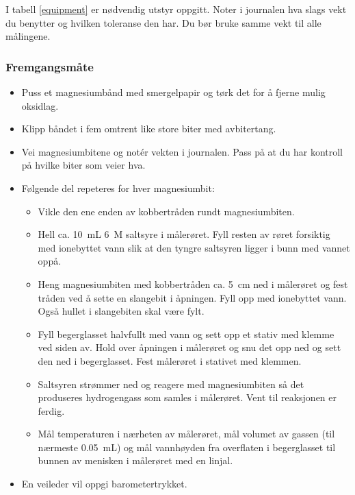 	I tabell \ref{equipment} er nødvendig utstyr oppgitt.	Noter i journalen hva slags vekt du benytter og hvilken toleranse den har. Du bør bruke samme vekt til alle målingene.
	
	\subsubsection{Fremgangsmåte}
	\begin{itemize}
		\item Puss et magnesiumbånd med smergelpapir og tørk det for å fjerne mulig oksidlag.
		
		\item Klipp båndet i fem omtrent like store biter med avbitertang.
		
		\item Vei magnesiumbitene og notér vekten i journalen. Pass på at du har kontroll på hvilke biter som veier hva.
		
		\item Følgende del repeteres for hver magnesiumbit:
		\begin{itemize}
			\item Vikle den ene enden av kobbertråden rundt magnesiumbiten. 
			
			\item Hell ca. \SI{10}{mL} \SI{6}{M} saltsyre i målerøret. Fyll resten av røret forsiktig med ionebyttet vann slik at den tyngre saltsyren ligger i bunn med vannet oppå.
			
			\item Heng magnesiumbiten med kobbertråden ca. \SI{5}{cm} ned i målerøret og fest tråden ved å sette en slangebit i åpningen. Fyll opp med ionebyttet vann. Også hullet i slangebiten skal være fylt.
			
			\item Fyll begerglasset halvfullt med vann og sett opp et stativ med klemme ved siden av. Hold over åpningen i målerøret og snu det opp ned og sett den ned i begerglasset. Fest målerøret i stativet med klemmen.
			
			\item Saltsyren strømmer ned og reagere med magnesiumbiten så det produseres hydrogengass som samles i målerøret. Vent til reaksjonen er ferdig.
			
			\item Mål temperaturen i nærheten av målerøret, mål volumet av gassen (til nærmeste \SI{0.05}{mL}) og mål vannhøyden fra overflaten i begerglasset til bunnen av menisken i målerøret med en linjal.
		\end{itemize}
		
		\item En veileder vil oppgi barometertrykket.
		
	\end{itemize}	
	
